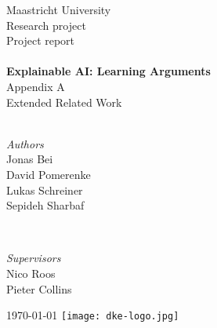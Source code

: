\begin{titlepage} %
	\center %
	\LARGE Maastricht University\\[1.5cm] 
	\Large Research project \\Project report\\[0.5cm]
    \HRule\\[0.35cm]
	{\huge\bfseries Explainable AI: Learning Arguments}\\
	Appendix A\\
	Extended Related Work\\
    \HRule\\[1.5cm]
	\begin{minipage}[t]{0.45\textwidth}
		\begin{flushleft}
			\large
			\textit{Authors}\\Jonas Bei\\ David Pomerenke\\ Lukas Schreiner\\ Sepideh Sharbaf
		\end{flushleft}
	\end{minipage}
	~
	\begin{minipage}[t]{0.45\textwidth}
		\begin{flushright}
			\large
			\textit{Supervisors}\\
			Nico Roos\\ Pieter Collins
		\end{flushright}
	\end{minipage}
	\vfill\vfill\vfill
	{\large\today} %
	\vfill\vfill\vfill %
	\texttt{[image: dke-logo.jpg]}\\
	
	\vfill %
\end{titlepage}